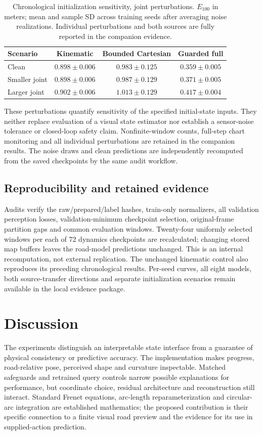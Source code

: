 \documentclass[preprint,12pt]{elsarticle}
\begin{document}
\begin{table}[t]
\centering\small
\caption{Chronological initialization sensitivity, joint perturbations. $E_{100}$ in meters; mean and sample SD across training seeds after averaging noise realizations. Individual perturbations and both sources are fully reported in the companion evidence.}
\label{tab:initialization}
\begin{tabular}{lccc}\toprule
Scenario & Kinematic & Bounded Cartesian & Guarded full \\ \midrule
Clean & $0.898 \pm 0.006$ & $0.983 \pm 0.125$ & $0.359 \pm 0.005$ \\
Smaller joint & $0.898 \pm 0.006$ & $0.987 \pm 0.129$ & $0.371 \pm 0.005$ \\
Larger joint & $0.902 \pm 0.006$ & $1.013 \pm 0.129$ & $0.417 \pm 0.004$ \\
\bottomrule\end{tabular}
\end{table}
These perturbations quantify sensitivity of the specified initial-state inputs.
They neither replace evaluation of a visual state estimator nor establish a
sensor-noise tolerance or closed-loop safety claim. Nonfinite-window counts,
full-step chart monitoring and all individual perturbations are retained in the
companion results. The noise draws and clean predictions are independently
recomputed from the saved checkpoints by the same audit workflow.

\subsection{Reproducibility and retained evidence}
Audits verify the raw/prepared/label hashes, train-only normalizers, all validation
perception losses, validation-minimum checkpoint selection, original-frame
partition gaps and common evaluation windows. Twenty-four uniformly selected
windows per each of 72 dynamics checkpoints are recalculated; changing stored
map buffers leaves the road-model predictions unchanged. This is an internal
recomputation, not external replication. The unchanged kinematic control also
reproduces its preceding chronological results. Per-seed curves, all eight
models, both source-transfer directions and separate initialization scenarios
remain available in the local evidence package.

\section{Discussion}\label{sec:discussion}
The experiments distinguish an interpretable state interface from a guarantee
of physical consistency or predictive accuracy. The implementation makes
progress, road-relative pose, perceived shape and curvature inspectable.
Matched safeguards and retrained query controls narrow possible explanations
for performance, but coordinate choice, residual architecture and reconstruction
still interact. Standard Frenet equations, arc-length reparameterization and
circular-arc integration are established mathematics; the proposed contribution
is their specific connection to a finite visual road preview and the evidence
for its use in supplied-action prediction.
\end{document}
